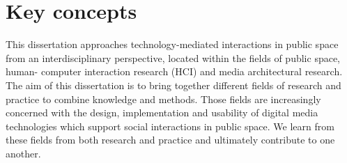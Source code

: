 


\newpage
 
\section{Key concepts}

This dissertation approaches technology-mediated interactions in public space from an interdisciplinary perspective, located within the fields of public space, human- computer interaction research (HCI) and media architectural research. 
The aim of this dissertation is to bring together different fields of research and practice to combine knowledge and methods.
Those fields are increasingly concerned with the design, implementation and usability of digital media technologies which support social interactions in public space.
We learn from these fields from both research and practice and ultimately contribute to one another.


